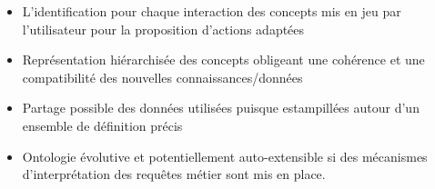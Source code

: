 

\begin{itemize}
    \item L'identification pour chaque interaction des concepts mis en jeu par l'utilisateur pour la proposition d'actions adaptées
    \item Représentation hiérarchisée des concepts obligeant une cohérence et une compatibilité des nouvelles connaissances/données
    \item Partage possible des données utilisées puisque estampillées autour d'un ensemble de définition précis
    \item Ontologie évolutive et potentiellement auto-extensible si des mécanismes d'interprétation des requêtes métier sont mis en place.
\end{itemize}



